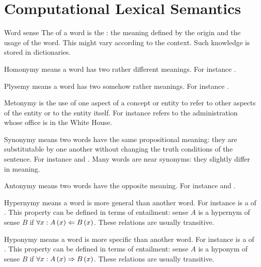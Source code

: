 \section{Computational Lexical Semantics}
\begin{df}{Word sense}
The \sb{} of a word is the : the meaning defined by the origin and the usage of the word. This might vary according to the context. Such knowledge is stored in dictionaries.
\end{df}
\begin{df}{Homonymy}
\sb{} means a word has two rather different meanings. For instance .
\end{df}
\begin{df}{Plysemy}
\sb{} means a word has two somehow rather meanings. For instance .
\end{df}
\begin{df}{Metonymy}
\sb{} is the use of one aspect of a concept or entity to refer to other aspects of the entity or to the entity itself. For instance  refers to the administration whose office is in the White House.
\end{df}
\begin{df}{Synonymy}
\sb{} means two words have the same propositional meaning: they are substitutable by one another without changing the truth conditions of the sentence. For instance  and . Many words are near synonyms: they slightly differ in meaning.
\end{df}
\begin{df}{Antonymy}
\sb{} means two words have the opposite meaning. For instance  and .
\end{df}
\begin{df}[Superordinate]{Hypernymy}
\sb{} means a word is more general than another word. For instance  is a  of . This property can be defined in terms of entailment: sense $A$ is a hypernym of sense $B$ if $\forall x:A\left(x\right)\Leftarrow B\left(x\right)$. These relations are usually transitive.
\end{df}
\begin{df}[Subordinate]{Hyponymy}
\sb{} means a word is more specific than another word. For instance  is a  of . This property can be defined in terms of entailment: sense $A$ is a hyponym of sense $B$ if $\forall x:A\left(x\right)\Rightarrow B\left(x\right)$. These relations are usually transitive.
\end{df}
